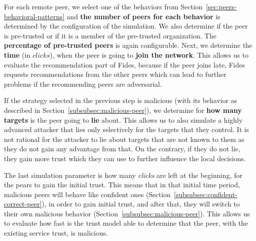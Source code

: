 For each remote peer, we select one of the behaviors from Section~\ref{sec:peers-behavioral-patterns} and \textbf{the number of peers for each behavior} is determined by the configuration of the simulation.
We also determine if the peer is pre-trusted or if it is a member of the pre-trusted organization. The \textbf{percentage of pre-trusted peers} is again configurable.
Next, we determine the \textbf{time} (in $clicks$), when the peer is going to \textbf{join the network}. This allows us to evaluate the recommendation part of Fides, because if the peer joins late, Fides requests recommendations from the other peers which can lead to further problems if the recommending peers are adversarial.

If the strategy selected in the previous step is malicious (with its behavior as described in Section~\ref{subsubsec:malicious-peer}), we determine for \textbf{how many targets} is the peer going to \textbf{lie} about.
This allows us to also simulate a highly advanced attacker that lies only selectively for the targets that they control.
It is not rational for the attacker to lie about targets that are not known to them as they do not gain any advantage from that. On the contrary, if they do not lie, they gain more trust which they can use to further influence the local decisions. 

The last simulation parameter is how many \textit{clicks} are left at the beginning, for the pears to gain the initial trust.
This means that in that initial time period, malicious peers will behave like confident ones (Section~\ref{subsubsec:confident-correct-peer}), in order to gain initial trust, and after that, they will switch to their own malicious behavior (Section~\ref{subsubsec:malicious-peer}).
This allows us to evaluate how fast is the trust model able to determine that the peer, with the existing service trust, is malicious.